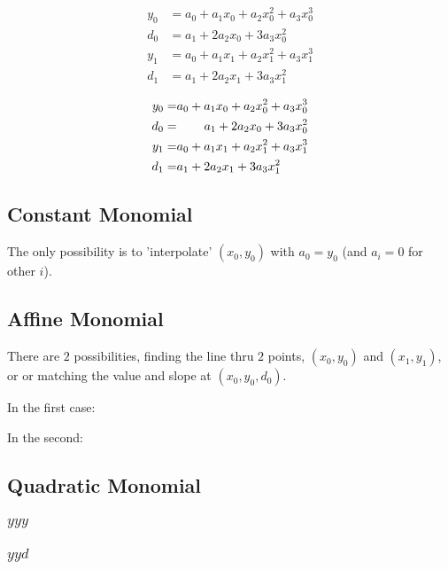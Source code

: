 \begin{align}\label{eq:hermite-eqns}
 y_0 & = a_0 + a_1 x_0 + a_2 x_0^2 + a_3 x_0^3 \\
 d_0 & = a_1 + 2 a_2 x_0 + 3 a_3 x_0^2 \nonumber \\
 y_1 & = a_0 + a_1 x_1 + a_2 x_1^2 + a_3 x_1^3 \nonumber \\
 d_1 & = a_1 + 2 a_2 x_1 + 3 a_3 x_1^2 \nonumber 
\end{align}

\begin{align}
 y_0 = &a_0 + a_1 x_0 + a_2 x_0^2 + a_3 x_0^3 \\
 d_0 = &\specialcell{\hfill a_1 + 2 a_2 x_0 + 3 a_3 x_0^2} \nonumber \\
 y_1 = &a_0 + a_1 x_1 + a_2 x_1^2 + a_3 x_1^3 \nonumber \\
 d_1 = &\specialcell{{\hfill a_1 + 2 a_2 x_1 + 3 a_3 x_1^2}} \nonumber 
\end{align}

\subsection{Constant Monomial}

The only possibility is to 'interpolate' $(x_0,y_0)$ with
$a_0 = y_0$ (and $a_i = 0$ for other $i$). 

\subsection{Affine Monomial}

There are $2$ possibilities, finding the line thru $2$ points,
$(x_0,y_0)$ and $(x_1,y_1)$, or or matching the value and slope at
$(x_0,y_0,d_0)$.

In the first case:


In the second:


\subsection{Quadratic Monomial}

\subsubsection{$yyy$}



\subsubsection{$yyd$}

